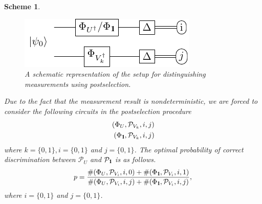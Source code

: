 \documentclass[preprint,12pt, a4paper]{elsarticle}
\newcommand{\1}{{\rm 1\hspace{-0.9mm}l}}
\newcommand{\Id}{{\rm 1\hspace{-0.9mm}l}}
\newcommand{\PP}{\mathcal{P}}
\newtheorem{scheme}{Scheme}
\begin{document}
\begin{scheme}
\begin{figure}[h!]
	\centering 
	\includegraphics[scale=1.7]{pics/postselection} 
	
	\caption{ A schematic representation of the setup for distinguishing
		measurements using postselection. 
	}\label{fig:postsellection}
\end{figure}  

Due to the fact that the measurement result is nondeterministic, we are forced to consider the following circuits
in the postselection procedure
\begin{equation}
\begin{split}
(\Phi_{U}, \mathcal{P}_{V_k}, i, j) \\ 
(\Phi_{\Id}, \mathcal{P}_{V_k}, i, j)
\end{split}
\end{equation}
where $k=\{0,1\}, i=\{0,1\}$ and $ j=\{0,1\}$. 
The optimal probability of correct discrimination between $\PP_{U} $ and $\PP_\Id$ is as follows.
		\begin{equation}
		p = \frac{\#(\Phi_U, \PP_{V_i},i,0) + \#(\Phi_\Id, \PP_{V_i},i,1)}{\#(\Phi_U, \PP_{V_i},i,j) + \#(\Phi_\Id, \PP_{V_i},i,j)}, 
		\end{equation}
where $i=\{0,1\}$ and $ j=\{0,1\}$. 

\end{scheme}
\end{document}
